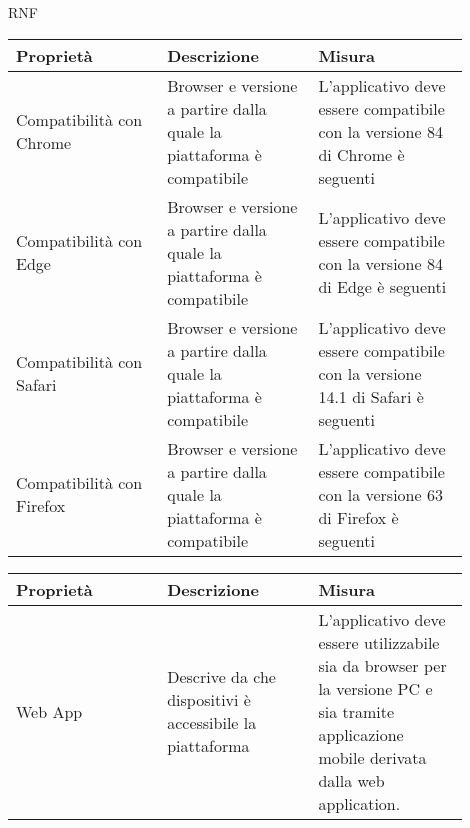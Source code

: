 \begin{listaPersonale}{RNF}
    \begin{tabular}{|p{0.3\linewidth}|p{0.3\linewidth}|p{0.3\linewidth}|}
        \hline
        \rowcolor{viola} \textbf{Proprietà} &
        \textbf{Descrizione}                &
        \textbf{Misura}                       \\
        \hline
        Compatibilità con Chrome            &
        Browser e versione a partire dalla
        quale la piattaforma è compatibile  &
        L'applicativo deve essere
        compatibile con la versione
        84 di Chrome è seguenti               \\
        \hline
        Compatibilità con Edge              &
        Browser e versione a partire dalla
        quale la piattaforma è compatibile  &
        L'applicativo deve essere
        compatibile con la versione
        84 di Edge è seguenti                 \\
        \hline
        Compatibilità con Safari            &
        Browser e versione a partire dalla
        quale la piattaforma è compatibile  &
        L'applicativo deve essere
        compatibile con la versione
        14.1 di Safari è seguenti             \\
        \hline
        Compatibilità con Firefox           &
        Browser e versione a partire dalla
        quale la piattaforma è compatibile  &
        L'applicativo deve essere
        compatibile con la versione
        63 di Firefox è seguenti              \\
        \hline
    \end{tabular}

    \begin{tabular}{|p{0.3\linewidth}|p{0.3\linewidth}|p{0.3\linewidth}|}
        \hline
        \rowcolor{viola} \textbf{Proprietà}                      &
        \textbf{Descrizione}                                     &
        \textbf{Misura}                                            \\
        \hline
        Web App                                                  &
        Descrive da che dispositivi è accessibile la piattaforma &
        L'applicativo deve essere utilizzabile sia da
        browser per la versione PC e sia tramite applicazione
        mobile derivata dalla web application.                     \\
        \hline
    \end{tabular}


\end{listaPersonale}
